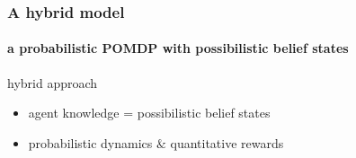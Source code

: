 \documentclass[12pt,svgnames,table]{beamer}
\begin{document}
\begin{frame}
\frametitle{A hybrid model}
\framesubtitle{\footnotesize a probabilistic POMDP with possibilistic belief states}
\begin{block}{hybrid approach}
\begin{itemize}
\item agent knowledge = possibilistic belief states 
\item probabilistic dynamics $\&$ quantitative rewards
\end{itemize}
\end{block}


\end{frame}
\end{document}
